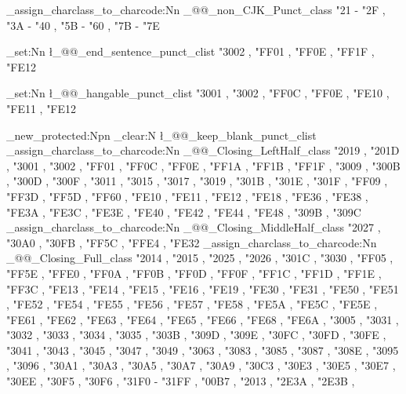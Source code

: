 \@@_assign_charclass_to_charcode:Nn \g_@@_non_CJK_Punct_class
  {
    "21 - "2F ,
    "3A - "40 ,
    "5B - "60 ,
    "7B - "7E
  }

\clist_set:Nn \l_@@_end_sentence_punct_clist
  {
    "3002 , "FF01 , "FF0E , "FF1F , "FE12
  }

\clist_set:Nn \l_@@_hangable_punct_clist
  {
    "3001 , "3002 , "FF0C , "FF0E ,
    "FE10 , "FE11 , "FE12
  }

\cs_new_protected:Npn \ChineseSimplifiedH
  {
    \clist_clear:N \l_@@_keep_blank_punct_clist
    \@@_assign_charclass_to_charcode:Nn \g_@@_Closing_LeftHalf_class
      {
        "2019 , "201D ,
        "3001 , "3002 , "FF01 , "FF0C , "FF0E ,
        "FF1A , "FF1B , "FF1F ,
        "3009 , "300B , "300D , "300F , "3011 ,
        "3015 , "3017 , "3019 , "301B , "301E ,
        "301F , "FF09 , "FF3D , "FF5D , "FF60 ,
        "FE10 , "FE11 , "FE12 ,
        "FE18 , "FE36 , "FE38 , "FE3A , "FE3C ,
        "FE3E , "FE40 , "FE42 , "FE44 , "FE48 ,
        "309B , "309C
      }
    \@@_assign_charclass_to_charcode:Nn \g_@@_Closing_MiddleHalf_class
      {
        "2027 ,
        "30A0 , "30FB ,
        "FF5C , "FFE4 ,
        "FE32
      }
    \@@_assign_charclass_to_charcode:Nn \g_@@_Closing_Full_class
      {
        "2014 , "2015 , "2025 , "2026 ,
        "301C , "3030 , "FF05 , "FF5E , "FFE0 ,
        "FF0A , "FF0B , "FF0D , "FF0F ,
        "FF1C , "FF1D , "FF1E , "FF3C ,
        "FE13 ,
        "FE14 , "FE15 , "FE16 , "FE19 , "FE30 ,
        "FE31 ,
        "FE50 , "FE51 , "FE52 , "FE54 , "FE55 ,
        "FE56 , "FE57 , "FE58 , "FE5A , "FE5C ,
        "FE5E , "FE61 , "FE62 , "FE63 , "FE64 ,
        "FE65 , "FE66 , "FE68 , "FE6A ,
        "3005 , "3031 , "3032 , "3033 , "3034 ,
        "3035 , "303B , "309D , "309E , "30FC ,
        "30FD , "30FE ,
        "3041 , "3043 , "3045 , "3047 , "3049 ,
        "3063 , "3083 , "3085 , "3087 , "308E ,
        "3095 , "3096 ,
        "30A1 , "30A3 , "30A5 , "30A7 , "30A9 ,
        "30C3 , "30E3 , "30E5 , "30E7 , "30EE ,
        "30F5 , "30F6 ,
        "31F0 - "31FF ,
        "00B7 , "2013 , "2E3A , "2E3B ,
}}
